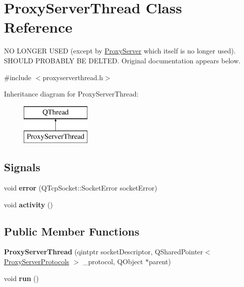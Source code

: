 \hypertarget{class_proxy_server_thread}{\section{Proxy\-Server\-Thread Class Reference}
\label{class_proxy_server_thread}
}


N\-O L\-O\-N\-G\-E\-R U\-S\-E\-D (except by \hyperlink{class_proxy_server}{Proxy\-Server} which itself is no longer used). S\-H\-O\-U\-L\-D P\-R\-O\-B\-A\-B\-L\-Y B\-E D\-E\-L\-T\-E\-D. Original documentation appears below.  




{\ttfamily \#include $<$proxyserverthread.\-h$>$}

Inheritance diagram for Proxy\-Server\-Thread\-:\begin{figure}[H]
\begin{center}
\leavevmode
\includegraphics[height=2.000000cm]{class_proxy_server_thread}
\end{center}
\end{figure}
\subsection*{Signals}
\begin{DoxyCompactItemize}
\item 
\hypertarget{class_proxy_server_thread_a8d2f14531bab2307bb81eed251c5b0b4}{void {\bfseries error} (Q\-Tcp\-Socket\-::\-Socket\-Error socket\-Error)}\label{class_proxy_server_thread_a8d2f14531bab2307bb81eed251c5b0b4}

\item 
\hypertarget{class_proxy_server_thread_a2f2fbb7e47e0534fc18b28687e9a5978}{void {\bfseries activity} ()}\label{class_proxy_server_thread_a2f2fbb7e47e0534fc18b28687e9a5978}

\end{DoxyCompactItemize}
\subsection*{Public Member Functions}
\begin{DoxyCompactItemize}
\item 
\hypertarget{class_proxy_server_thread_ad1bc4f931f601a9393e265a8d1f06d78}{{\bfseries Proxy\-Server\-Thread} (qintptr socket\-Descriptor, Q\-Shared\-Pointer$<$ \hyperlink{struct_proxy_server_protocols}{Proxy\-Server\-Protocols} $>$ \-\_\-protocol, Q\-Object $\ast$parent)}\label{class_proxy_server_thread_ad1bc4f931f601a9393e265a8d1f06d78}

\item 
\hypertarget{class_proxy_server_thread_a06ee312a58b297706532195d46322b42}{void {\bfseries run} ()}\label{class_proxy_server_thread_a06ee312a58b297706532195d46322b42}

\end{DoxyCompactItemize}


